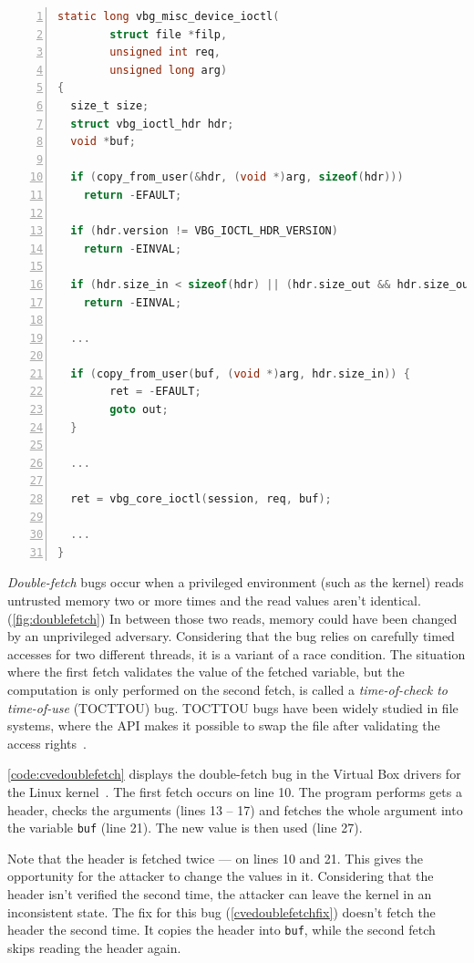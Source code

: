 \documentclass[conference]{IEEEtran}
\begin{document}
\begin{lstlisting}[language=C, caption=Abridged CVE-2018-12633 Double Fetch in Linux,
                  label=code:cvedoublefetch,  breaklines=true
                  postbreak=\mbox{\textcolor{red}{$\hookrightarrow$}\space},
                  numbers=left,basicstyle=\scriptsize, xleftmargin=5.0ex]
static long vbg_misc_device_ioctl(
        struct file *filp,
        unsigned int req,
        unsigned long arg)
{
  size_t size;
  struct vbg_ioctl_hdr hdr;
  void *buf;

  if (copy_from_user(&hdr, (void *)arg, sizeof(hdr))) 
    return -EFAULT;
  
  if (hdr.version != VBG_IOCTL_HDR_VERSION) 
    return -EINVAL;
   
  if (hdr.size_in < sizeof(hdr) || (hdr.size_out && hdr.size_out < sizeof(hdr)))
    return -EINVAL;
  
  ...
  
  if (copy_from_user(buf, (void *)arg, hdr.size_in)) {
		ret = -EFAULT;
		goto out;
  }

  ...

  ret = vbg_core_ioctl(session, req, buf);

  ...
}
\end{lstlisting}
\emph{Double-fetch} bugs occur when a privileged environment (such as the
kernel) reads untrusted memory two or more times and the read values aren't
identical. (\autoref{fig:doublefetch}) In between those two reads, memory could
have been changed by an unprivileged adversary. Considering that the bug relies
on carefully timed accesses for two different threads, it is a variant of a race
condition. The situation where the first fetch validates the value of the
fetched variable, but the computation is only performed on the second fetch, is
called a \emph{time-of-check to time-of-use} (TOCTTOU) bug. TOCTTOU bugs have
been widely studied in file systems, where the API makes it possible to swap the
file after validating the access rights~\cite{payer2012protecting,
pu2006methodical, wei2010modeling, tsafrir2008portably}.

\autoref{code:cvedoublefetch} displays the double-fetch bug in the Virtual Box
drivers for the Linux kernel~\cite{cve201812633}. The first fetch occurs on line
10. The program performs gets a header, checks the arguments (lines 13 -- 17)
and fetches the whole argument into the variable \texttt{buf} (line 21). The new
value is then used (line 27).

Note that the header is fetched twice --- on lines 10 and 21. This gives the
opportunity for the attacker to change the values in it. Considering
that the header isn't verified the second time, the attacker can
leave the kernel in an inconsistent state. The fix for this bug
(\autoref{cvedoublefetchfix}) doesn't fetch the header the second time. It
copies the header into \texttt{buf}, while the second fetch skips reading the header
again.
\end{document}
